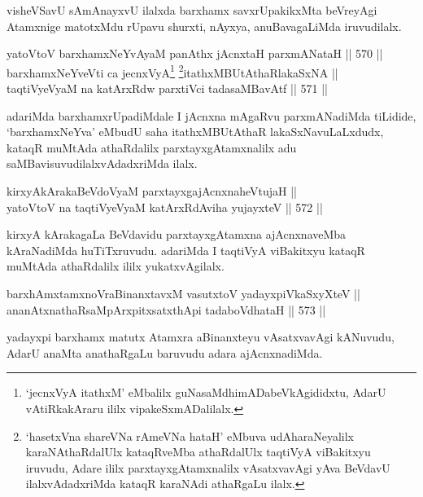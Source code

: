 \begin{artha}
visheVSavU sAmAnayxvU ilalxda barxhamx savxrUpakikxMta beVreyAgi
Atamxnige matotxMdu rUpavu shurxti, nAyxya, anuBavagaLiMda
iruvudilalx.
\end{artha}

\begin{shl}
yatoV\s toV barxhamxNeYvAyaM panAthx jAcnxtaH parxmANataH \hfill || 570 ||  \\
barxhamxNeYveVti ca jecnxVyA\footnote{`jecnxVyA itathxM' eMbalilx guNasaMdhimADabeVkAgididxtu,
AdarU vAtiRkakAraru ililx vipakeSxmADalilalx.} \footnote{`hasetxVna shareVNa rAmeVNa hataH' eMbuva udAharaNeyalilx karaNAthaRdalUlx kataqRveMba athaRdalUlx taqtiVyA viBakitxyu iruvudu, Adare ililx parxtayxgAtamxnalilx vAsatxvavAgi yAva BeVdavU ilalxvAdadxriMda kataqR karaNAdi athaRgaLu ilalx.}itathxMBUtAthaRlakaSxNA || \\
taqtiVyeVyaM na katArxRdw parxtiVci tadasaMBavAtf \hfill || 571 ||  
\end{shl}



\begin{artha}
adariMda barxhamxrUpadiMdale I jAcnxna mAgaRvu parxmANadiMda
tiLidide, `barxhamxNeYva' eMbudU saha itathxMBUtAthaR
lakaSxNavuLaLxdudx, kataqR muMtAda athaRdalilx parxtayxgAtamxnalilx
adu saMBavisuvudilalxvAdadxriMda ilalx.
\end{artha}


\begin{shl}
kirxyAkArakaBeVdoV\s yaM parxtayxgajAcnxnaheVtujaH || \\
yatoV\s toV na taqtiVyeVyaM katArxRdAviha yujayxteV \hfill || 572 ||  
\end{shl}

\begin{artha}
kirxyA kArakagaLa BeVdavidu parxtayxgAtamxna ajAcnxnaveMba kAraNadiMda
huTiTxruvudu. adariMda I taqtiVyA viBakitxyu kataqR muMtAda athaRdalilx
ililx yukatxvAgilalx.
\end{artha}

\begin{shl}
barxhAmxtamxnoVraBinanxtavxM vasutxtoV yadayxpiVkaSxyXteV || \\
ananAtxnathaRsaMpArxpitxsatxthA\s pi tadaboVdhataH \hfill || 573 ||   
\end{shl}

\begin{artha}
yadayxpi barxhamx matutx Atamxra aBinanxteyu vAsatxvavAgi kANuvudu,
AdarU anaMta anathaRgaLu baruvudu adara ajAcnxnadiMda.
\end{artha}

